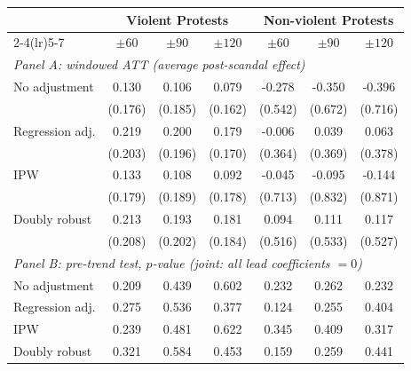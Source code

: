 {
\def\sym#1{\ifmmode^{#1}\else\(^{#1}\)\fi}
\begin{tabular}{l*{6}{c}}
\toprule
 & \multicolumn{3}{c}{Violent Protests} & \multicolumn{3}{c}{Non-violent Protests} \\
\cmidrule(lr){2-4}\cmidrule(lr){5-7}
 & \ensuremath{\pm 60} & \ensuremath{\pm 90} & \ensuremath{\pm 120} & \ensuremath{\pm 60} & \ensuremath{\pm 90} & \ensuremath{\pm 120} \\
\midrule
\multicolumn{7}{l}{\textit{Panel A: windowed ATT (average post-scandal effect)}}\\
No adjustment & 0.130 & 0.106 & 0.079 & -0.278 & -0.350 & -0.396 \\
             & (0.176) & (0.185) & (0.162) & (0.542) & (0.672) & (0.716) \\
Regression adj. & 0.219 & 0.200 & 0.179 & -0.006 & 0.039 & 0.063 \\
             & (0.203) & (0.196) & (0.170) & (0.364) & (0.369) & (0.378) \\
IPW & 0.133 & 0.108 & 0.092 & -0.045 & -0.095 & -0.144 \\
             & (0.179) & (0.189) & (0.178) & (0.713) & (0.832) & (0.871) \\
Doubly robust & 0.213 & 0.193 & 0.181 & 0.094 & 0.111 & 0.117 \\
             & (0.208) & (0.202) & (0.184) & (0.516) & (0.533) & (0.527) \\
\midrule
\multicolumn{7}{l}{\textit{Panel B: pre-trend test, \(p\)-value (joint: all lead coefficients \(=0\))}}\\
No adjustment & 0.209 & 0.439 & 0.602 & 0.232 & 0.262 & 0.232 \\
Regression adj. & 0.275 & 0.536 & 0.377 & 0.124 & 0.255 & 0.404 \\
IPW & 0.239 & 0.481 & 0.622 & 0.345 & 0.409 & 0.317 \\
Doubly robust & 0.321 & 0.584 & 0.453 & 0.159 & 0.259 & 0.441 \\
\bottomrule
\end{tabular}
}

